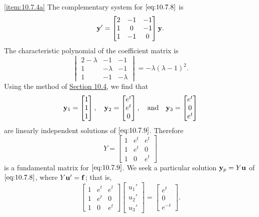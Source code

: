 \documentclass{ximera}
\begin{document}
\begin{example}
\begin{explanation}\ref{item:10.7.4a} 
The complementary system for $\eqref{eq:10.7.8}$ is
\begin{equation} \label{eq:10.7.9}
{\bf y}'=\begin{bmatrix}2&-1&-1\\1&0&-1\\1&-1&0\end{bmatrix}{\bf y}.
\end{equation}
The characteristic polynomial of the coefficient matrix is
$$
\begin{vmatrix}2-\lambda&-1&-1\\1&-\lambda&-1\\1&-1&-\lambda
\end{vmatrix}=
-\lambda(\lambda-1)^2.
$$
Using the method of \href{https://xerxes.ximera.org/differentialequations/main/constCoeffHomSysI/constCoeffHomSysI}{Section 10.4}, we find that
$$
{\bf y}_1=\begin{bmatrix}1\\1\\1\end{bmatrix},\quad
{\bf y}_2=\begin{bmatrix}e^t\\e^t\\0\end{bmatrix},
\quad\mbox{and}\quad
{\bf y}_3=\begin{bmatrix}e^t\\0\\e^t\end{bmatrix}
$$
are linearly independent solutions of $\eqref{eq:10.7.9}$.
Therefore
$$
Y=\begin{bmatrix}1&e^t&e^t\\1&e^t&0\\1&0&e^t\end{bmatrix}
$$
is a fundamental matrix for  $\eqref{eq:10.7.9}$.
We seek a particular solution  ${\bf y}_p=Y{\bf u}$ of
$\eqref{eq:10.7.8}$, where
$Y{\bf u}'={\bf f}$; that is,
$$
\begin{bmatrix}1&e^t&e^t\\1&e^t&0\\1&0&e^t\end{bmatrix}
\begin{bmatrix}u_1'\\u_2'\\u_3'\end{bmatrix}=
\begin{bmatrix}e^t\\0\\e^{-t}\end{bmatrix}.
$$
\end{explanation}
\end{example}
\end{document}
